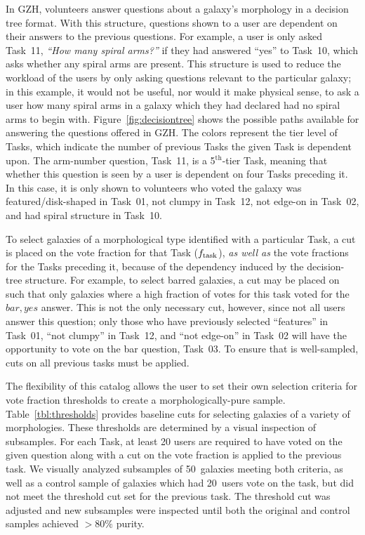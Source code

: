 \documentclass[twocolumn]{aastex6}
\begin{document}
In GZH, volunteers answer questions about a galaxy's morphology in a decision tree format. With this structure, questions shown to a user are dependent on their answers to the previous questions. For example, a user is only asked Task~11, {\it ``How many spiral arms?''} if they had answered ``yes'' to Task~10, which asks whether any spiral arms are present. This structure is used to reduce the workload of the users by only asking questions relevant to the particular galaxy; in this example, it would not be useful, nor would it make physical sense, to ask a user how many spiral arms in a galaxy which they had declared had no spiral arms to begin with. Figure~\ref{fig:decisiontree} shows the possible paths available for answering the questions offered in GZH. The colors represent the tier level of Tasks, which indicate the number of previous Tasks the given Task is dependent upon. The arm-number question, Task~11, is a 5$^\mathrm{th}$-tier Task, meaning that whether this question is seen by a user is dependent on four Tasks preceding it. In this case, it is only shown to volunteers who voted the galaxy was featured/disk-shaped in Task~01, not clumpy in Task~12, not edge-on in Task~02, and had spiral structure in Task~10.  

To select galaxies of a morphological type identified with a particular Task, a cut is placed on the vote fraction for that Task ($f_{\rm task}$), \emph{as well as} the vote fractions for the Tasks preceding it, because of the dependency induced by the decision-tree structure. For example, to select barred galaxies, a cut may be placed on \fbar{} such that only galaxies where a high fraction of votes for this task voted for the $bar,yes$ answer. This is not the only necessary cut, however, since not all users answer this question; only those who have previously selected ``features'' in Task~01, ``not clumpy'' in Task~12, and ``not edge-on'' in Task~02 will have the opportunity to vote on the bar question, Task~03. To ensure that \fbar{} is well-sampled, cuts on all previous tasks must be applied. 

The flexibility of this catalog allows the user to set their own selection criteria for vote fraction thresholds to create a morphologically-pure sample. Table~\ref{tbl:thresholds} provides baseline cuts for selecting galaxies of a variety of morphologies. These thresholds are determined by a visual inspection of subsamples. For each Task, at least 20 users are required to have voted on the given question along with a cut on the vote fraction is applied to the previous task. We visually analyzed subsamples of 50~galaxies meeting both criteria, as well as a control sample of galaxies which had 20~users vote on the task, but did not meet the threshold cut set for the previous task. The threshold cut was adjusted and new subsamples were inspected until both the original and control samples achieved $>80\%$ purity.
\end{document}
